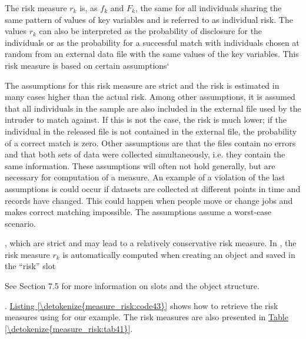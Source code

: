 \documentclass[letterpaper,10pt,english]{sphinxmanual}
\begin{document}
The risk measure \(r_{k}\) is, as \(f_{k}\) and \(F_{k}\),
the same for all individuals sharing the same pattern of values of key
variables and is referred to as individual risk. The values
\(r_{k}\) can also be interpreted as the probability of disclosure
for the individuals or as the probability for a successful match with
individuals chosen at random from an external data file with the same
values of the key variables. This risk measure is based on certain
assumptions{}` %
\begin{footnote}[6]\sphinxAtStartFootnote
The assumptions for this risk measure are strict and the risk is
estimated in many cases higher than the actual risk. Among other
assumptions, it is assumed that all individuals in the sample are
also included in the external file used by the intruder to match
against. If this is not the case, the risk is much lower; if the
individual in the released file is not contained in the external
file, the probability of a correct match is zero. Other assumptions
are that the files contain no errors and that both sets of data were
collected simultaneously, i.e. they contain the same information.
These assumptions will often not hold generally, but are necessary
for computation of a measure. An example of a violation of the last
assumptions is could occur if datasets are collected at different
points in time and records have changed. This could happen when
people move or change jobs and makes correct matching impossible. The
assumptions assume a worst-case scenario.
%
\end{footnote}, which are strict and may lead to a
relatively conservative risk measure. In , the risk measure
\(r_{k}\) is automatically computed when creating an 
object and saved in the “risk” slot %
\begin{footnote}[7]\sphinxAtStartFootnote
See Section 7.5 for more information on slots and the 
object structure.
%
\end{footnote}. \hyperref[\detokenize{measure_risk:code43}]{Listing \ref{\detokenize{measure_risk:code43}}}
shows how to retrieve the risk measures using  for our
example. The risk measures are also presented in \hyperref[\detokenize{measure_risk:tab41}]{Table \ref{\detokenize{measure_risk:tab41}}}.
\end{document}
